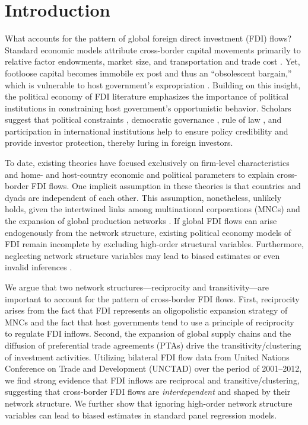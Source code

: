 \documentclass[reqno,onecolumn,letterpaper,12pt]{article}
\begin{document}
\clearpage
\doublespacing
\setcounter{page}{1}
\section{Introduction}


What accounts for the pattern of global foreign direct investment (FDI) flows? Standard economic models attribute cross-border capital movements primarily to relative factor endowments, market size, and transportation and trade cost \citep[see,~e.g.,][]{Helpman:1984,Carr_et_al:2001}. Yet, footloose capital becomes immobile ex post and thus an ``obsolescent bargain,'' which is vulnerable to host government's expropriation \citep{Vernon:1971,Vernon:1980}. Building on this insight, the political economy of FDI literature emphasizes the importance of political institutions in constraining host government's opportunistic behavior. Scholars suggest that political constraints \citep{Henisz:2000}, democratic governance \citep{Jensen:2003,Jensen:2006}, rule of law \citep{Li_Resnick:2003,Staats_Biglaiser:2012}, and participation in international institutions \citep{Buthe_Milner:2008,Allee_Peinhardt:2011} help to ensure policy credibility and provide investor protection, thereby luring in foreign investors.

To date, existing theories have focused exclusively on firm-level characteristics and home- and host-country economic and political parameters to explain cross-border FDI flows. One implicit assumption in these theories is that countries and dyads are independent of each other. This assumption, nonetheless, unlikely holds, given the intertwined links among multinational corporations (MNCs) and the expansion of global production networks \citep{UNCTAD:2013}. If global FDI flows can arise endogenously from the network structure, existing political economy models of FDI remain incomplete by excluding high-order structural variables. Furthermore, neglecting network structure variables may lead to biased estimates or even invalid inferences \citep{cranmer2011inferential}.

We argue that two network structures---reciprocity and transitivity---are important to account for the pattern of cross-border FDI flows. First, reciprocity arises from the fact that FDI represents an oligopolistic expansion strategy of MNCs and the fact that host governments tend to use a principle of reciprocity to regulate FDI inflows. Second, the expansion of global supply chains and the diffusion of preferential trade agreements (PTAs) drive the transitivity/clustering of investment activities. Utilizing bilateral FDI flow data from United Nations Conference on Trade and Development (UNCTAD) over the period of 2001--2012, we find strong evidence that FDI inflows are reciprocal and transitive/clustering, suggesting that cross-border FDI flows are \textit{interdependent} and shaped by their network structure. We further show that ignoring high-order network structure variables can lead to biased estimates in standard panel regression models.
\end{document}

